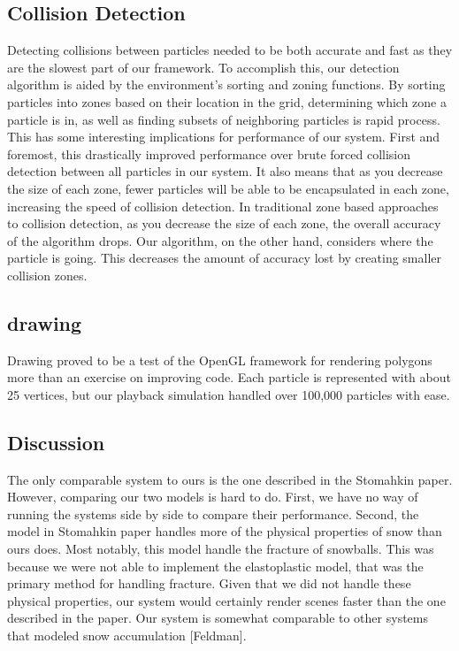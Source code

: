 \documentclass{acm_proc_article-sp}
\begin{document}
\subsection{Collision Detection}
Detecting collisions between particles needed to be both accurate and fast as they are the slowest part of our framework. To accomplish this, our detection algorithm is aided by the environment’s sorting and zoning functions. By sorting particles into zones based on their location in the grid, determining which zone a particle is in, as well as finding subsets of neighboring particles is rapid process. This has some interesting implications for performance of our system. First and foremost, this drastically improved performance over brute forced collision detection between all particles in our system. It also means that as you decrease the size of each zone, fewer particles will be able to be encapsulated in each zone, increasing the speed of collision detection. In traditional zone based approaches to collision detection, as you decrease the size of each zone, the overall accuracy of the algorithm drops. Our algorithm, on the other hand, considers where the particle is going. This decreases the amount of accuracy lost by creating smaller collision zones.

\subsection{drawing}
Drawing proved to be a test of the OpenGL framework for rendering polygons more than an exercise on improving code. Each particle is represented with about 25 vertices, but our playback simulation handled over 100,000 particles with ease.

\subsection{Discussion}
The only comparable system to ours is the one described in the Stomahkin paper. However, comparing our two models is hard to do. First, we have no way of running the systems side by side to compare their performance. Second, the model in Stomahkin paper handles more of the physical properties of snow than ours does. Most notably, this model handle the fracture of snowballs. This was because we were not able to implement the elastoplastic model, that was the primary method for handling fracture. Given that we did not handle these physical properties, our system would certainly render scenes faster than the one described in the paper. Our system is somewhat comparable to other systems that modeled snow accumulation [Feldman].
\end{document}
